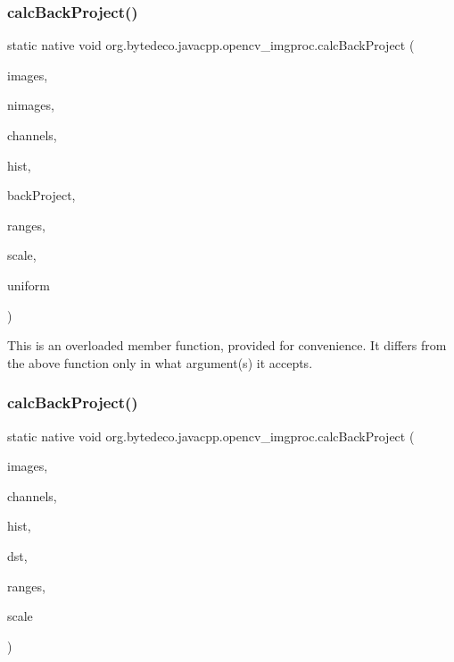 \subsubsection{\texorpdfstring{calc\+Back\+Project()}{calcBackProject()}\hspace{0.1cm}{\footnotesize\ttfamily [2/3]}}
{\footnotesize\ttfamily static native void org.\+bytedeco.\+javacpp.\+opencv\+\_\+imgproc.\+calc\+Back\+Project (\begin{DoxyParamCaption}\item[{@Const Mat}]{images,  }\item[{int}]{nimages,  }\item[{@Const Int\+Pointer}]{channels,  }\item[{@Const @By\+Ref Sparse\+Mat}]{hist,  }\item[{@By\+Val Mat}]{back\+Project,  }\item[{@Cast(\char`\"{}const float$\ast$$\ast$\char`\"{}) Pointer\+Pointer}]{ranges,  }\item[{double}]{scale,  }\item[{@Cast(\char`\"{}bool\char`\"{}) boolean}]{uniform }\end{DoxyParamCaption})\hspace{0.3cm}{\ttfamily [static]}}

This is an overloaded member function, provided for convenience. It differs from the above function only in what argument(s) it accepts. \mbox{\label{group__imgproc__hist_ga08b1470561cb4171cc528b2bdba50764}} 
\subsubsection{\texorpdfstring{calc\+Back\+Project()}{calcBackProject()}\hspace{0.1cm}{\footnotesize\ttfamily [3/3]}}
{\footnotesize\ttfamily static native void org.\+bytedeco.\+javacpp.\+opencv\+\_\+imgproc.\+calc\+Back\+Project (\begin{DoxyParamCaption}\item[{@By\+Val Mat\+Vector}]{images,  }\item[{@Std\+Vector Int\+Pointer}]{channels,  }\item[{@By\+Val Mat}]{hist,  }\item[{@By\+Val Mat}]{dst,  }\item[{@Std\+Vector Float\+Pointer}]{ranges,  }\item[{double}]{scale }\end{DoxyParamCaption})\hspace{0.3cm}{\ttfamily [static]}}

